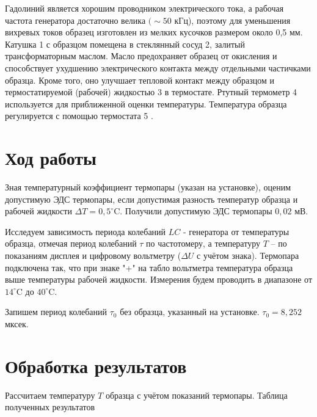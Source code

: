 \documentclass[a4paper, 12pt]{article}%
\begin{document}
Гадолиний является хорошим проводником электрического тока, а рабочая частота генератора достаточно велика $(\sim 50$ кГц), поэтому для уменьшения вихревых токов образец изготовлен из мелких кусочков размером около 0,5 мм. Катушка 1 с образцом помещена в стеклянный сосуд 2, залитый трансформаторным маслом. Масло предохраняет образец от окисления и способствует ухудшению электрического контакта между отдельными частичками образца. Кроме того, оно улучшает тепловой контакт между образцом и термостатируемой (рабочей) жидкостью 3 в термостате. Ртутный термометр 4 используется для приближенной оценки температуры. Температура образца регулируется с помощью термостата 5 .


\section{Ход работы}

Зная температурный коэффициент термопары (указан на установке), оценим допустимую ЭДС термопары, если допустимая разность температур образца и рабочей жидкости $\Delta T=0,5^{\circ} \mathrm{C}$. Получили допустимую ЭДС термопары $0,02$ мВ.

Исследуем зависимость периода колебаний $LC$ - генератора от температуры образца, отмечая период колебаний $\tau$ по частотомеру, а температуру $T$ -- по показаниям дисплея и цифровому вольтметру ($\Delta U$ с учётом знака). Термопара подключена так, что при знаке "+" на табло вольтметра температура образца выше температуры рабочей жидкости.
Измерения будем проводить в диапазоне от $14^{\circ} \mathrm{C}$ до $40^{\circ} \mathrm{C}$.

Запишем период колебаний $\tau_{0}$ без образца, указанный на установке. $\tau_{0} = 8,252$ мксек.

\section{Обработка результатов}

Рассчитаем температуру $T$ образца с учётом показаний термопары. Таблица полученных результатов
\end{document}

